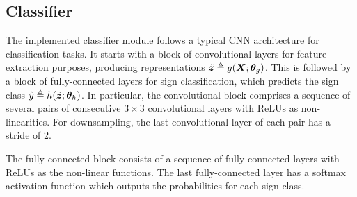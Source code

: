 \subsection{Classifier}
The implemented classifier module follows a typical CNN architecture for classification tasks. It starts with a block of convolutional layers for feature extraction purposes, producing representations $\tilde{{\bm{z}}} \triangleq g({\bm{X}};{\bm{\theta}}_g)$. This is followed by a block of fully-connected layers for sign classification, which predicts the sign class $\hat{y} \triangleq h(\tilde{{\bm{z}}};{\bm{\theta}}_h)$. In particular, the convolutional block comprises a sequence of several pairs of consecutive $3 \times 3$ convolutional layers with ReLUs as non-linearities. For downsampling, the last convolutional layer of each pair has a stride of 2.

The fully-connected block consists of a sequence of fully-connected layers with ReLUs as the non-linear functions. The last fully-connected layer has a softmax activation function which outputs the probabilities for each sign class.
